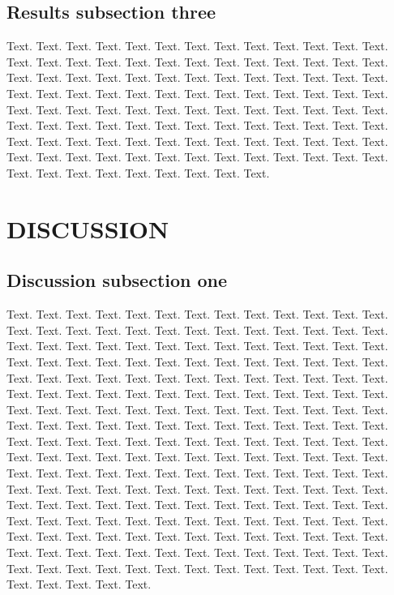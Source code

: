 \documentclass[a4,center,fleqn]{NAR}
\begin{document}
\subsection{Results subsection three}

Text. Text. Text. Text. Text. Text. Text. Text. Text. Text. Text.
Text. Text. Text. Text. Text. Text. Text. Text. Text. Text. Text.
Text. Text. Text. Text. Text. Text. Text. Text. Text. Text. Text.
Text. Text. Text. Text. Text. Text. Text. Text. Text. Text. Text.
Text. Text. Text. Text. Text. Text. Text. Text. Text. Text. Text.
Text. Text. Text. Text. Text. Text. Text. Text. Text. Text. Text.
Text. Text. Text. Text. Text. Text. Text. Text. Text. Text. Text.
Text. Text. Text. Text. Text. Text. Text. Text. Text. Text. Text.
Text. Text. Text. Text. Text. Text. Text. Text. Text. Text. Text.
Text. Text. Text. Text. Text. Text. Text. Text. Text. Text. Text.
Text. Text. Text.


\section{DISCUSSION}

\subsection{Discussion subsection one}

Text. Text. Text. Text. Text. Text. Text. Text. Text. Text. Text.
Text. Text. Text. Text. Text. Text. Text. Text. Text. Text. Text.
Text. Text. Text. Text. Text. Text. Text. Text. Text. Text. Text.
Text. Text. Text. Text. Text. Text. Text. Text. Text. Text. Text.
Text. Text. Text. Text. Text. Text. Text. Text. Text. Text. Text.
Text. Text. Text. Text. Text. Text. Text. Text. Text. Text. Text.
Text. Text. Text. Text. Text. Text. Text. Text. Text. Text. Text.
Text. Text. Text. Text. Text. Text. Text. Text. Text. Text. Text.
Text. Text. Text. Text. Text. Text. Text. Text. Text. Text. Text.
Text. Text. Text. Text. Text. Text. Text. Text. Text. Text. Text.
Text. Text. Text. Text. Text. Text. Text. Text. Text. Text. Text.
Text. Text. Text. Text. Text. Text. Text. Text. Text. Text. Text.
Text. Text. Text. Text. Text. Text. Text. Text. Text. Text. Text.
Text. Text. Text. Text. Text. Text. Text. Text. Text. Text. Text.
Text. Text. Text. Text. Text. Text. Text. Text. Text. Text. Text.
Text. Text. Text. Text. Text. Text. Text. Text. Text. Text. Text.
Text. Text. Text. Text. Text. Text. Text. Text. Text. Text. Text.
Text. Text. Text. Text. Text. Text. Text. Text. Text. Text. Text.
Text. Text. Text. Text. Text. Text. Text. Text. Text. Text. Text.
Text. Text. Text. Text. Text. Text. Text. Text. Text. Text. Text.
Text. Text. Text. Text. Text. Text.
\end{document}
